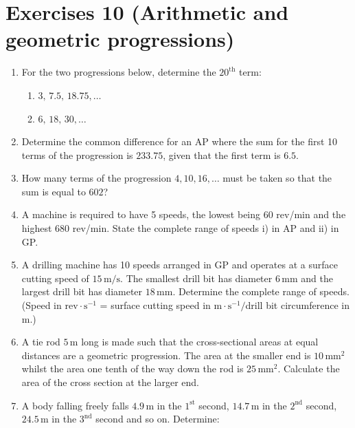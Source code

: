 \documentclass[
  12pt,
  oneside]{book}
\providecommand{\tightlist}{%
  \setlength{\itemsep}{0pt}\setlength{\parskip}{0pt}}
\theoremstyle{definition}
\theoremstyle{definition}
\theoremstyle{definition}
\theoremstyle{definition}
\theoremstyle{remark}
\begin{document}
\hypertarget{exercises-10-arithmetic-and-geometric-progressions}{%
\chapter*{Exercises 10 (Arithmetic and geometric progressions)}\label{exercises-10-arithmetic-and-geometric-progressions}}

\begin{enumerate}
\def\labelenumi{\arabic{enumi}.}
\item
  For the two progressions below, determine the \(20^{\mathrm{th}}\) term:

  \begin{enumerate}
  \def\labelenumii{\roman{enumii})}
  \tightlist
  \item
    \(3,\,7.5,\,18.75,\dots\)
  \item
    \(6,\,18,\,30,\dots\)
  \end{enumerate}
\item
  Determine the common difference for an AP where the sum for the first 10 terms of the progression is \(233.75\), given that the first term is \(6.5\).
\item
  How many terms of the progression \(4,10,16,\dots\) must be taken so that the sum is equal to \(602\)?
\item
  A machine is required to have 5 speeds, the lowest being 60 rev/min and the highest 680 rev/min. State the complete range of speeds i) in AP and ii) in GP.
\item
  A drilling machine has 10 speeds arranged in GP and operates at a surface cutting speed of \(15\,\mathrm{m/s}\). The smallest drill bit has diameter \(6\,\mathrm{mm}\) and the largest drill bit has diameter \(18\,\mathrm{mm}\). Determine the complete range of speeds. (Speed in \(\mathrm{rev}\cdot\mathrm{s}^{-1}\) = surface cutting speed in \(\mathrm{m}\cdot\mathrm{s}^{-1}/\)drill bit circumference in \(\mathrm{m}\).)
\item
  A tie rod \(5\,\mathrm{m}\) long is made such that the cross-sectional areas at equal distances are a geometric progression. The area at the smaller end is \(10\,\mathrm{mm}^2\) whilst the area one tenth of the way down the rod is \(25\,\mathrm{mm}^2\). Calculate the area of the cross section at the larger end.
\item
  A body falling freely falls \(4.9\,\mathrm{m}\) in the \(1^{\mathrm{st}}\) second, \(14.7\,\mathrm{m}\) in the \(2^{\mathrm{nd}}\) second, \(24.5\,\mathrm{m}\) in the \(3^{\mathrm{nd}}\) second and so on. Determine:


\end{enumerate}
\end{document}
